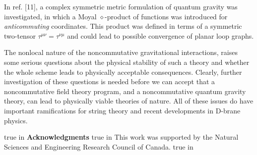 \documentclass[a4paper,10pt]{article}
\begin{document}
In ref. [11], a complex symmetric metric formulation of quantum
gravity was investigated, in which a Moyal $\diamond$-product of functions 
was introduced for {\it anticommuting} coordinates. This product was 
defined in terms of a symmetric two-tensor $\tau^{\mu\nu}=\tau^{\nu\mu}$ 
and could lead to possible convergence of planar loop graphs.

The nonlocal nature of the noncommutative
gravitational interactions, raises some serious questions about the
physical stability of such a theory and whether the whole scheme leads to
physically acceptable consequences. Clearly, further investigation of these
questions is needed before we can accept that a noncommutative field
theory program, and a noncommutative quantum gravity theory, can lead to
physically viable theories of nature. All of these issues do have
important ramifications for string theory and recent developments in
D-brane physics.

true in {\bf Acknowledgments}
 true in
This work was supported by the Natural Sciences and Engineering Research Council of
Canada.
 true in
\end{document}
